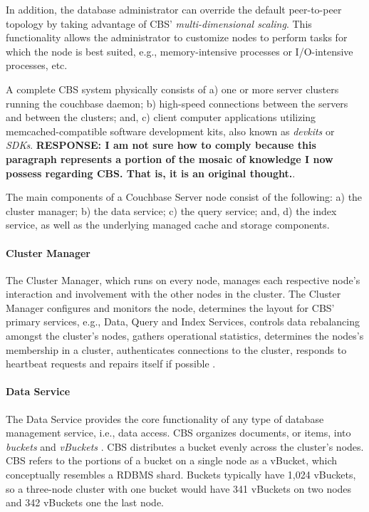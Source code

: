 \documentclass[9pt,twocolumn,twoside]{styles/osajnl}
\begin{document}
In addition, the database administrator can override the default peer-to-peer topology by taking advantage of CBS' \textit{multi-dimensional scaling}.  This functionality allows the administrator to customize nodes to perform tasks for which the node is best suited, e.g., memory-intensive processes or I/O-intensive processes, etc.

A complete CBS system physically consists of a) one or more server clusters running the couchbase daemon; b) high-speed connections between the servers and between the clusters; and, c) client computer applications utilizing memcached-compatible software development kits, also known as \textit{devkits} or \textit{SDKs}.
\textbf{RESPONSE: I am not sure how to comply because this paragraph represents a portion of the mosaic of knowledge I now possess regarding CBS.  That is, it is an original thought.}.  

The main components of a Couchbase Server node consist of the following: a) the cluster manager; b) the data service; c) the query service; and, d) the index service, as well as the underlying managed cache and storage components.
\cite{www-components-cbsinc}

\paragraph{Cluster Manager} The Cluster Manager, which runs on every node, manages each respective node's interaction and involvement with the other nodes in the cluster.  The Cluster Manager configures and monitors the node, determines the layout for CBS' primary services, e.g., Data, Query and Index Services, controls data rebalancing amongst the cluster's nodes, gathers operational statistics, determines the nodes's membership in a cluster, authenticates connections to the cluster, responds to heartbeat requests and repairs itself if possible \cite{www-clustermanager-cbsinc,www-components-cbsinc}.

\paragraph{Data Service} The Data Service provides the core functionality of any type of database management service, i.e., data access.  CBS organizes documents, or items, into \textit{buckets} and \textit{vBuckets} \cite{www-architecture-cbsinc}.  CBS distributes a bucket evenly across the cluster's nodes.  CBS refers to the portions of a bucket on a single node as a vBucket, which conceptually resembles a RDBMS shard.  Buckets typically have 1,024 vBuckets, so a three-node cluster with one bucket would have 341 vBuckets on two nodes and 342 vBuckets one the last node.  
\end{document}
